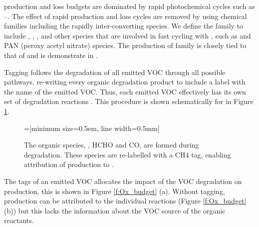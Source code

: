  production and loss budgets are dominated by rapid photochemical cycles such as --.
The effect of rapid production and loss cycles are removed by using chemical families including the rapidly inter-converting species.
We define the  family to include , , ,  and other species that are involved in fast cycling with , such as  and PAN (peroxy acetyl nitrate) species.
The production of  family is closely tied to that of  and is demonstrate in \citet{Butler:2011}.

Tagging follows the degradation of all emitted VOC through all possible pathways, re-writing every organic degradation product to include a label with the name of the emitted VOC.
Thus, each emitted VOC effectively has its own set of degradation reactions \citep{Butler:2011}.
This procedure is shown schematically for  in Figure \ref{f:tagging_approach}.

\begin{figure}
    \centering
    =[minimum size=0.5em, line width=0.5mm]
    \vspace{1mm}
    \caption{The organic species, , HCHO and CO, are formed during  degradation. These species are re-labelled with a CH4 tag, enabling attribution of  production to .}
    \vspace{-4mm}
    \label{f:tagging_approach}
\end{figure} 

The tags of an emitted VOC allocates the impact of the VOC degradation on  production, this is shown in Figure \ref{f:Ox_budget} (a).
Without tagging,  production can be attributed to the individual reactions (Figure \ref{f:Ox_budget} (b)) but this lacks the information about the VOC source of the organic reactants.

